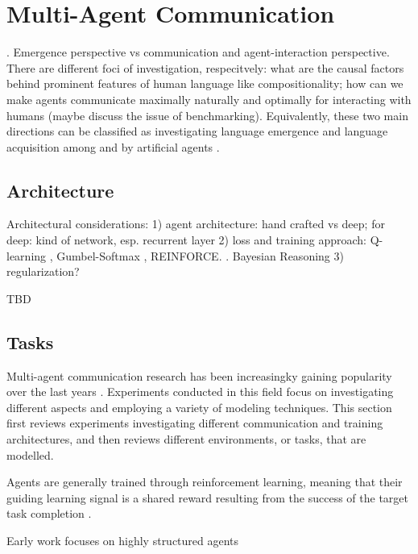 \section{Multi-Agent Communication}

. Emergence perspective vs communication and agent-interaction perspective. There are different foci of investigation, respecitvely: what are the causal factors behind prominent features of human language like compositionality; how can we make agents communicate maximally naturally and optimally for interacting with humans (maybe discuss the issue of benchmarking). Equivalently, these two main directions can be classified as investigating language emergence and language acquisition among and by artificial agents \parencite{lazaridou2018emergence}.

\subsection{Architecture}

Architectural considerations: 
1) agent architecture: hand crafted vs deep; for deep: kind of network, esp. recurrent layer
2) loss and training approach: Q-learning \parencite{foerster2016learning}, Gumbel-Softmax \parencite{havrylov2017emergence}, REINFORCE.  \parencite{lazaridou2020emergent, williams1992simple}. Bayesian Reasoning \parencite{andreas2016reasoning}
3) regularization?

TBD

\subsection{Tasks}
Multi-agent communication research has been increasingky gaining popularity over the last years \parencite{lazaridou2020multi}. Experiments conducted in  this field focus on investigating different aspects and employing a variety of modeling techniques. This section first reviews experiments investigating different communication and training architectures, and then reviews different environments, or tasks, that are modelled. 

 Agents are generally trained through reinforcement learning, meaning that their guiding learning signal is a shared reward resulting from the success of the target task completion \parencite{lazaridou2020multi, sutton2018reinforcement}. 

Early work focuses on highly structured agents 


